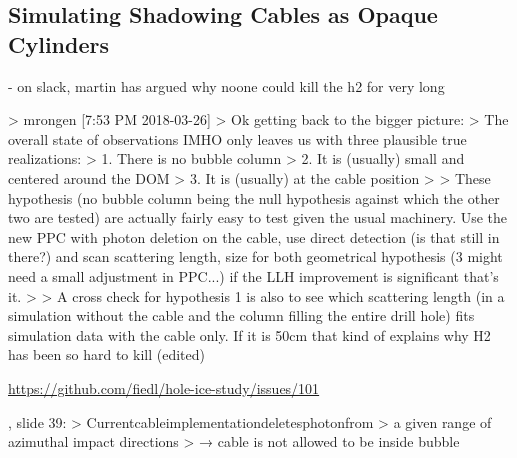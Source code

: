 
\subsection{Simulating Shadowing Cables as Opaque Cylinders}
\label{sec:cables}

- on slack, martin has argued why noone could kill the h2 for very long

> mrongen [7:53 PM 2018-03-26]
> Ok getting back to the bigger picture:
> The overall state of observations IMHO only leaves us with three plausible true realizations:
>  1. There is no bubble column
>  2. It is (usually) small and centered around the DOM
>  3. It is (usually) at the cable position
>
> These hypothesis (no bubble column being the null hypothesis against which the other two are tested) are actually fairly easy to test given the usual machinery. Use the new PPC with photon deletion on the cable, use direct detection (is that still in there?) and scan scattering length, size for both geometrical hypothesis (3 might need a small adjustment in PPC...) if the LLH improvement is significant that's it.
>
> A cross check for hypothesis 1 is also to see which scattering length (in a simulation without the cable and the column filling the entire drill hole) fits simulation data with the cable only. If it is 50cm that kind of explains why H2 has been so hard to kill (edited)


\url{https://github.com/fiedl/hole-ice-study/issues/101}


\cite{martinspicehddard}, slide 39:
> Currentcableimplementationdeletesphotonfrom
> a given range of azimuthal impact directions
> → cable is not allowed to be inside bubble